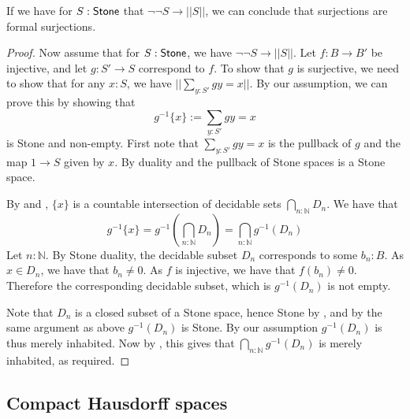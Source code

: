 \documentclass{../util/zariski-small}
\begin{document}
\begin{corollary}\label{CorDoubleNegToAx2}
  If we have for $S:\mathsf{Stone}$ that $\neg \neg S \to ||S||$, 
  we can conclude that surjections are formal surjections. 
\end{corollary}
\begin{proof}
  Now assume that for $S:\mathsf{Stone}$, we have $\neg \neg S \to ||S||$. 
  Let $f:B \to B'$ be injective, and let 
  $g:S' \to S$ correspond to $f$. 
  To show that $g$ is surjective, we need to show that for any $x:S$, we have $||\sum\limits_{y:S'} g y = x||$. 
  By our assumption, we can prove this by showing that 
  \begin{equation}
    g^{-1}\{x\} := \sum\limits_{y:S'} g y = x
  \end{equation} is Stone and non-empty. 
    First note that $\sum\limits_{y:S'} g y = x$ is the pullback of $g$ and the map $1 \to S$ given by $x$.
      By duality and  the pullback of Stone spaces is a Stone space. 
   

      By  and , 
      $\{x\}$ is a countable intersection of decidable sets $\bigcap_{n:\mathbb N} D_n$. 
      We have that 
      \begin{equation}
        g^{-1}\{x\} = g^{-1}(\bigcap_{n:\mathbb N} D_n) = 
        \bigcap_{n:\mathbb N} g^{-1}(D_n)
      \end{equation} 
      Let $n:\mathbb N$. By Stone duality, the decidable subset $D_n$ corresponds to some $b_n:B$. 
      As $x\in D_n$, we have that $b_n \neq 0$. 
      As $f$ is injective, we have that $f(b_n) \neq 0$. 
      Therefore the corresponding decidable subset, which is $g^{-1}(D_n)$ is not empty. 

      Note that $D_n$ is a closed subset of a Stone space, hence Stone by , 
      and by the same argument as above $g^{-1}(D_n)$ is Stone. By our assumption $g^{-1}(D_n)$ is thus merely inhabited. 
      Now by , this gives that 
      $\bigcap_{n:\mathbb N} g^{-1}(D_n)$ is merely inhabited, as required. 
\end{proof}



\subsection{Compact Hausdorff spaces}
\end{document}
